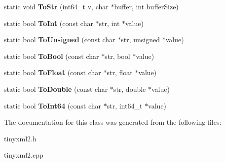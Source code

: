 \begin{DoxyCompactItemize}
\item 
\hypertarget{classtinyxml2_1_1_x_m_l_util_a26a8cb5b833ad587b3af39469c8111de}{}static void {\bfseries To\+Str} (int64\+\_\+t v, char $\ast$buffer, int buffer\+Size)\label{classtinyxml2_1_1_x_m_l_util_a26a8cb5b833ad587b3af39469c8111de}

\item 
\hypertarget{classtinyxml2_1_1_x_m_l_util_ad4df4023d11ee3fca9689c49b9707323}{}static bool {\bfseries To\+Int} (const char $\ast$str, int $\ast$value)\label{classtinyxml2_1_1_x_m_l_util_ad4df4023d11ee3fca9689c49b9707323}

\item 
\hypertarget{classtinyxml2_1_1_x_m_l_util_a210c8637d5eb4ce3d4625294af0efc2f}{}static bool {\bfseries To\+Unsigned} (const char $\ast$str, unsigned $\ast$value)\label{classtinyxml2_1_1_x_m_l_util_a210c8637d5eb4ce3d4625294af0efc2f}

\item 
\hypertarget{classtinyxml2_1_1_x_m_l_util_ae5b03e0a1ca5d42052a7ac540f7aa12a}{}static bool {\bfseries To\+Bool} (const char $\ast$str, bool $\ast$value)\label{classtinyxml2_1_1_x_m_l_util_ae5b03e0a1ca5d42052a7ac540f7aa12a}

\item 
\hypertarget{classtinyxml2_1_1_x_m_l_util_a399e71edb5f29d61ea81d91ee0332bb9}{}static bool {\bfseries To\+Float} (const char $\ast$str, float $\ast$value)\label{classtinyxml2_1_1_x_m_l_util_a399e71edb5f29d61ea81d91ee0332bb9}

\item 
\hypertarget{classtinyxml2_1_1_x_m_l_util_ad8f75ac140fb19c1c6e164a957c4cd53}{}static bool {\bfseries To\+Double} (const char $\ast$str, double $\ast$value)\label{classtinyxml2_1_1_x_m_l_util_ad8f75ac140fb19c1c6e164a957c4cd53}

\item 
\hypertarget{classtinyxml2_1_1_x_m_l_util_afe2ea09257431cd2b4b6d440552e4195}{}static bool {\bfseries To\+Int64} (const char $\ast$str, int64\+\_\+t $\ast$value)\label{classtinyxml2_1_1_x_m_l_util_afe2ea09257431cd2b4b6d440552e4195}

\end{DoxyCompactItemize}


The documentation for this class was generated from the following files\+:\begin{DoxyCompactItemize}
\item 
tinyxml2.\+h\item 
tinyxml2.\+cpp\end{DoxyCompactItemize}
